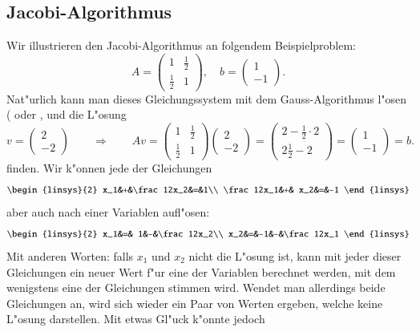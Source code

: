 \subsection{Jacobi-Algorithmus}
Wir illustrieren den Jacobi-Algorithmus an folgendem Beispielproblem:
\begin{equation}
A=\begin{pmatrix}1&\frac12\\\frac12&1\end{pmatrix},\quad
b=\begin{pmatrix}1\\-1\end{pmatrix}.
\label{jacobi-beispiel}
\end{equation}
Nat"urlich kann man dieses Gleichungssystem mit dem Gauss-Algorithmus
l"osen (\cite[Kapitel 1]{skript:linalg} oder \cite[Chapter 1]{skript:watkins},
und die L"osung
\[
v=\begin{pmatrix}2\\-2\end{pmatrix}\qquad\Rightarrow\qquad
Av=
\begin{pmatrix}1&\frac12\\\frac12&1\end{pmatrix}
\begin{pmatrix}2\\-2\end{pmatrix}
=
\begin{pmatrix}2-\frac12\cdot 2\\2\frac12-2\end{pmatrix}
=
\begin{pmatrix}1\\-1\end{pmatrix}=b.
\]
finden. Wir k"onnen jede der Gleichungen 
\[
\begin{linsys}{2}
       x_1&+&\frac12x_2&=&1\\
\frac12x_1&+&       x_2&=&-1
\end{linsys}
\]
aber auch nach einer Variablen aufl"osen:
\[
\begin{linsys}{2}
x_1&=& 1&-&\frac12x_2\\
x_2&=&-1&-&\frac12x_1
\end{linsys}
\]
Mit anderen Worten: falls $x_1$ und $x_2$
nicht die L"osung ist, kann mit jeder dieser Gleichungen ein neuer
Wert f"ur eine der Variablen berechnet werden, mit dem wenigstens
eine der Gleichungen stimmen wird.
Wendet man allerdings beide
Gleichungen an, wird sich wieder ein Paar von Werten ergeben,
welche keine L"osung darstellen. Mit etwas Gl"uck k"onnte jedoch
